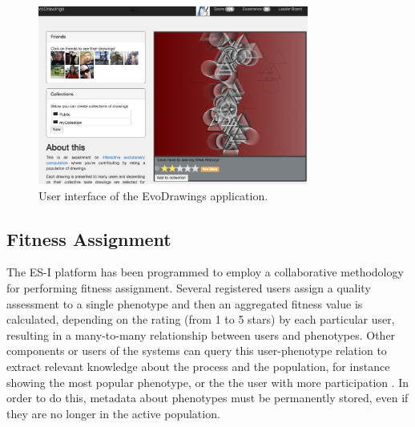 \begin{figure}[!t]
    \centering
        \includegraphics[width=3.5in]{img/interface.png}
    \caption{User interface of the EvoDrawings application.}
    \label{fig:web}
\end{figure}

\subsection{Fitness Assignment}
\label{sec:assignment}

The ES-I platform has been programmed to employ a 
collaborative methodology for performing fitness assignment. 
Several registered users assign a quality assessment to a single
phenotype and then an aggregated fitness value is calculated,
depending on the rating (from 1 to 5 stars) by each particular user,  
resulting in a many-to-many relationship between users and
phenotypes. Other components or users of the systems can 
query this user-phenotype relation to extract relevant
knowledge about the process and the population, for instance showing the
most popular phenotype, or the the user with more participation 
\cite{picbreeder}.
In order to do this, metadata about phenotypes 
must be permanently stored, even
if they are no longer in the active population. 

